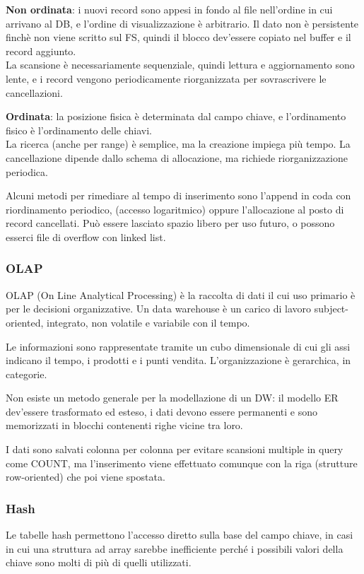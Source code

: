 \textbf{Non ordinata}: i nuovi record sono appesi in fondo al file nell'ordine in cui arrivano al DB, e l'ordine di visualizzazione è arbitrario. Il dato non è persistente finchè non viene scritto sul FS, quindi il blocco dev'essere copiato nel buffer e il record aggiunto. \\
La scansione è necessariamente sequenziale, quindi lettura e aggiornamento sono lente, e i record vengono periodicamente riorganizzata per sovrascrivere le cancellazioni.

\textbf{Ordinata}: la posizione fisica è determinata dal campo chiave, e l'ordinamento fisico è l'ordinamento delle chiavi. \\
La ricerca (anche per range) è semplice, ma la creazione impiega più tempo. La cancellazione dipende dallo schema di allocazione, ma richiede riorganizzazione periodica. 

Alcuni metodi per rimediare al tempo di inserimento sono l'append in coda con riordinamento periodico, (accesso logaritmico) oppure l'allocazione al posto di record cancellati. Può essere lasciato spazio libero per uso futuro, o possono esserci file di overflow con linked list.

\subsubsection{OLAP}
OLAP (On Line Analytical Processing) è la raccolta di dati il cui uso primario è per le decisioni organizzative. Un data warehouse è un carico di lavoro subject-oriented, integrato, non volatile e variabile con il tempo. 
	
Le informazioni sono rappresentate tramite un cubo dimensionale di cui gli assi indicano il tempo, i prodotti e i punti vendita. L'organizzazione è gerarchica, in categorie.

Non esiste un metodo generale per la modellazione di un DW: il modello ER dev'essere trasformato ed esteso, i dati devono essere permanenti e sono memorizzati in blocchi contenenti righe vicine tra loro. 

I dati sono salvati colonna per colonna per evitare scansioni multiple in query come COUNT, ma l'inserimento viene effettuato comunque con la riga (strutture row-oriented) che poi viene spostata.

\subsubsection{Hash}
Le tabelle hash permettono l'accesso diretto sulla base del campo chiave, in casi in cui una struttura ad array sarebbe inefficiente perché i possibili valori della chiave sono molti di più di quelli utilizzati.


